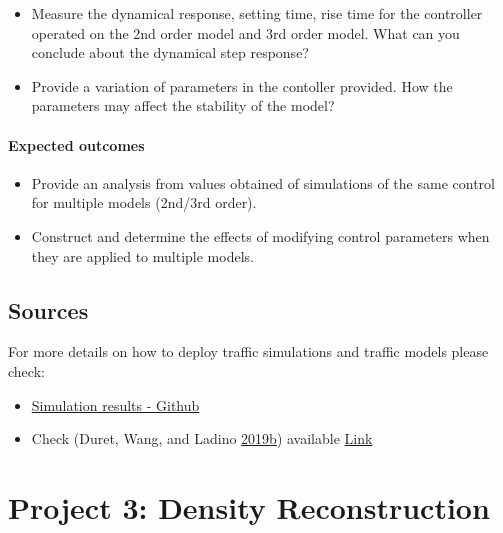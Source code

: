 \documentclass[]{book}
\providecommand{\tightlist}{%
  \setlength{\itemsep}{0pt}\setlength{\parskip}{0pt}}
\theoremstyle{definition}
\theoremstyle{definition}
\theoremstyle{definition}
\theoremstyle{remark}
\begin{document}
\begin{itemize}
\tightlist
\item
  Measure the dynamical response, setting time, rise time for the
  controller operated on the 2nd order model and 3rd order model. What
  can you conclude about the dynamical step response?
\item
  Provide a variation of parameters in the contoller provided. How the
  parameters may affect the stability of the model?
\end{itemize}

\hypertarget{expected-outcomes-7}{%
\subsubsection*{Expected outcomes}\label{expected-outcomes-7}}

\begin{itemize}
\tightlist
\item
  Provide an analysis from values obtained of simulations of the same
  control for multiple models (2nd/3rd order).
\item
  Construct and determine the effects of modifying control parameters
  when they are applied to multiple models.
\end{itemize}

\hypertarget{sources-1}{%
\section*{Sources}\label{sources-1}}

For more details on how to deploy traffic simulations and traffic models
please check:

\begin{itemize}
\item
  \href{https://github.com/research-licit/Hierarchical-Platooning/blob/dev/Operational/platoon-closed-3rd.py}{Simulation
  results - Github}
\item
  Check (Duret, Wang, and Ladino
  \protect\hyperlink{ref-Duret2019}{2019}\protect\hyperlink{ref-Duret2019}{b})
  available \href{http://bit.ly/Hierarchical_ISTTT}{Link}
\end{itemize}

\hypertarget{project-3-density-reconstruction}{%
\chapter*{Project 3: Density
Reconstruction}\label{project-3-density-reconstruction}}
\end{document}
